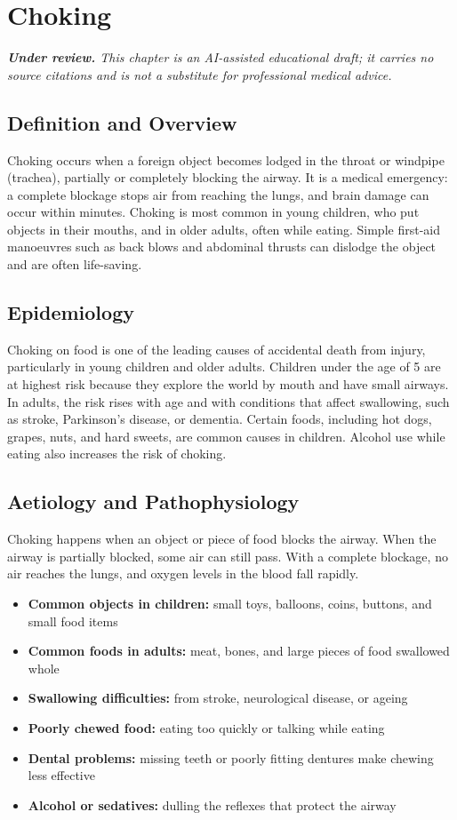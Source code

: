 \chapter{Choking}

\medskip
\noindent\textit{\textbf{Under review.} This chapter is an AI-assisted educational draft; it carries no source citations and is not a substitute for professional medical advice.}

\section*{Definition and Overview}
Choking occurs when a foreign object becomes lodged in the throat or windpipe (trachea), partially or completely blocking the airway. It is a medical emergency: a complete blockage stops air from reaching the lungs, and brain damage can occur within minutes. Choking is most common in young children, who put objects in their mouths, and in older adults, often while eating. Simple first-aid manoeuvres such as back blows and abdominal thrusts can dislodge the object and are often life-saving.

\section*{Epidemiology}
Choking on food is one of the leading causes of accidental death from injury, particularly in young children and older adults. Children under the age of 5 are at highest risk because they explore the world by mouth and have small airways. In adults, the risk rises with age and with conditions that affect swallowing, such as stroke, Parkinson's disease, or dementia. Certain foods, including hot dogs, grapes, nuts, and hard sweets, are common causes in children. Alcohol use while eating also increases the risk of choking.

\section*{Aetiology and Pathophysiology}
Choking happens when an object or piece of food blocks the airway. When the airway is partially blocked, some air can still pass. With a complete blockage, no air reaches the lungs, and oxygen levels in the blood fall rapidly.

\begin{itemize}
    \item \textbf{Common objects in children:} small toys, balloons, coins, buttons, and small food items
    \item \textbf{Common foods in adults:} meat, bones, and large pieces of food swallowed whole
    \item \textbf{Swallowing difficulties:} from stroke, neurological disease, or ageing
    \item \textbf{Poorly chewed food:} eating too quickly or talking while eating
    \item \textbf{Dental problems:} missing teeth or poorly fitting dentures make chewing less effective
    \item \textbf{Alcohol or sedatives:} dulling the reflexes that protect the airway
\end{itemize}
